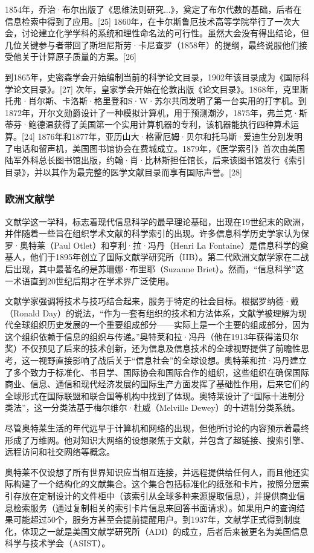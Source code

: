 1854年，乔治·布尔出版了《思维法则研究...》，奠定了布尔代数的基础，后者在信息检索中得到了应用。[25] 1860年，在卡尔斯鲁厄技术高等学院举行了一次大会，讨论建立化学学科的系统和理性命名法的可行性。虽然大会没有得出结论，但几位关键参与者带回了斯坦尼斯劳·卡尼查罗（1858年）的提纲，最终说服他们接受他关于计算原子质量的方案。[26]

到1865年，史密森学会开始编制当前的科学论文目录，1902年该目录成为《国际科学论文目录》。[27] 次年，皇家学会开始在伦敦出版《论文目录》。1868年，克里斯托弗·肖尔斯、卡洛斯·格里登和S·W·苏尔共同发明了第一台实用的打字机。到1872年，开尔文勋爵设计了一种模拟计算机，用于预测潮汐，1875年，弗兰克·斯蒂芬·鲍德温获得了美国第一个实用计算机器的专利，该机器能执行四种算术运算。[24] 1876年和1877年，亚历山大·格雷厄姆·贝尔和托马斯·爱迪生分别发明了电话和留声机，美国图书馆协会在费城成立。1879年，《医学索引》首次由美国陆军外科总长图书馆出版，约翰·肖·比林斯担任馆长，后来该图书馆发行《索引目录》，并以其作为最完整的医学文献目录而享有国际声誉。[28]
\subsubsection{欧洲文献学}  
文献学这一学科，标志着现代信息科学的最早理论基础，出现在19世纪末的欧洲，并伴随着一些旨在组织学术文献的科学索引的出现。许多信息科学历史学家认为保罗·奥特莱（Paul Otlet）和亨利·拉·冯丹（Henri La Fontaine）是信息科学的奠基人，他们于1895年创立了国际文献学研究所（IIB）。第二代欧洲文献学家在二战后出现，其中最著名的是苏珊娜·布里耶（Suzanne Briet）。然而，“信息科学”这一术语直到20世纪后期才在学术界广泛使用。

文献学家强调将技术与技巧结合起来，服务于特定的社会目标。根据罗纳德·戴（Ronald Day）的说法，“作为一套有组织的技术和方法体系，文献学被理解为现代全球组织历史发展的一个重要组成部分——实际上是一个主要的组成部分，因为这个组织依赖于信息的组织与传递。”奥特莱和拉·冯丹（他在1913年获得诺贝尔奖）不仅预见了后来的技术创新，还为信息及信息技术的全球视野提供了前瞻性思考，这一视野直接影响了战后关于“信息社会”的全球设想。奥特莱和拉·冯丹建立了多个致力于标准化、书目学、国际协会和国际合作的组织，这些组织在确保国际商业、信息、通信和现代经济发展的国际生产方面发挥了基础性作用，后来它们的全球形式在国际联盟和联合国等机构中找到了体现。奥特莱设计了“国际十进制分类法”，这一分类法基于梅尔维尔·杜威（Melville Dewey）的十进制分类系统。

尽管奥特莱生活的年代远早于计算机和网络的出现，但他所讨论的内容预示着最终形成了万维网。他对知识大网络的设想聚焦于文献，并包含了超链接、搜索引擎、远程访问和社交网络等概念。

奥特莱不仅设想了所有世界知识应当相互连接，并远程提供给任何人，而且他还实际构建了一个结构化的文献集合。这个集合包括标准化的纸张和卡片，按照分层索引存放在定制设计的文件柜中（该索引从全球多种来源提取信息），并提供商业信息检索服务（通过复制相关的索引卡片信息来回答书面请求）。如果用户的查询结果可能超过50个，服务方甚至会提前提醒用户。到1937年，文献学正式得到制度化，体现之一就是美国文献学研究所（ADI）的成立，后者后来被更名为美国信息科学与技术学会（ASIST）。
